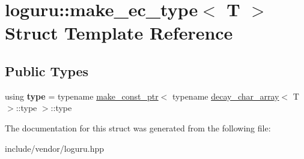 \hypertarget{structloguru_1_1make__ec__type}{}\section{loguru\+:\+:make\+\_\+ec\+\_\+type$<$ T $>$ Struct Template Reference}
\label{structloguru_1_1make__ec__type}
\subsection*{Public Types}
\begin{DoxyCompactItemize}
\item 
\mbox{\label{structloguru_1_1make__ec__type_af897663dabd4b6f59405e9bea02fdcda}} 
using {\bfseries type} = typename \mbox{\hyperlink{structloguru_1_1make__const__ptr}{make\+\_\+const\+\_\+ptr}}$<$ typename \mbox{\hyperlink{structloguru_1_1decay__char__array}{decay\+\_\+char\+\_\+array}}$<$ T $>$\+::type $>$\+::type
\end{DoxyCompactItemize}


The documentation for this struct was generated from the following file\+:\begin{DoxyCompactItemize}
\item 
include/vendor/loguru.\+hpp\end{DoxyCompactItemize}

